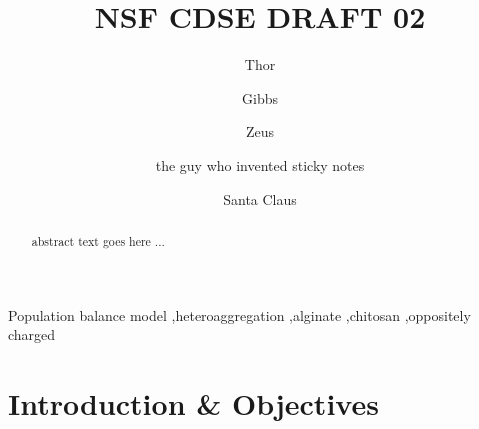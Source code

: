 \documentclass[preprint,11pt,authoryear]{elsarticle}
\begin{document}
	\begin{frontmatter}
	\title{ NSF CDSE DRAFT 02}
	\author{Thor }
	\author{Gibbs }
	\author{Zeus }
	\author{the guy who invented sticky notes }
	\author{Santa Claus} 
	\address{North Pole department of ice and snow Fwding address - Department of Chemical and Biochemical Engineering, Rutgers, The State University of New Jersey, Piscataway, NJ, USA 08854}
	\begin{abstract}
	 abstract text goes here ...
	\end{abstract}
	\begin{keyword}
	Population balance model \sep heteroaggregation \sep alginate  \sep chitosan \sep oppositely charged
	\end{keyword}
	\end{frontmatter}
	\linenumbers
	
	\section{Introduction \& Objectives} 
\end{document}
